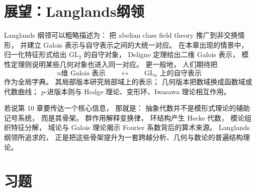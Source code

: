 \section{展望：Langlands纲领}
Langlands 纲领可以粗略描述为： 把 abelian class field theory 推广到非交换情形， 并建立 Galois 表示与自守表示之间的大统一对应。 在本章出现的情景中， 归一化特征形式给出 GL$_2$ 的自守对象， Deligne 定理给出二维 Galois 表示， 模性定理则说明某些几何对象也进入同一对应。
更一般地，
人们期待把
\[ \text{$n$维 Galois 表示} \qquad\longleftrightarrow\qquad \text{GL$_n$ 上的自守表示} \]
作为全局字典。
其局部版本研究局部域上的表示；
几何版本把数域换成函数域或代数曲线；
$p$-进版本则与 Hodge 理论、变形环、Iwasawa 理论相互作用。
\begin{remark}
若说第 10 章要传达一个核心信息，
那就是：
抽象代数并不是模形式理论的辅助记号系统，
而是其骨架。
群作用解释变换律，
环结构产生 Hecke 代数，
模论组织特征分解，
域论与 Galois 理论揭示 Fourier 系数背后的算术来源。
Langlands 纲领所追求的，
正是把这些骨架提升为一套跨越分析、几何与数论的普遍结构理论。
\end{remark}
\section*{习题}
